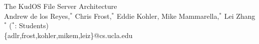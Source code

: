 \documentclass[twocolumn,10pt]{article}
\begin{document}
\begin{center}
{\LARGE The KudOS File Server Architecture}\\
\vspace{0.08in}
{\large Andrew de los Reyes,$^*$ Chris Frost,$^*$ Eddie Kohler, Mike Mammarella,$^*$ Lei Zhang$^*$ } ($^*$: Students)\\
{\large \{adlr,frost,kohler,mikem,leiz\}@cs.ucla.edu }
\end{center}









\end{document}
